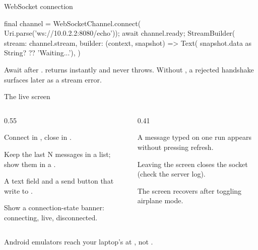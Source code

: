 \documentclass[10pt,aspectratio=169,t]{beamer}
\begin{document}
\begin{frame}[fragile,eyebrow=Task III]{WebSocket connection}
\begin{dart}
final channel = WebSocketChannel.connect(
    Uri.parse('ws://10.0.2.2:8080/echo'));
await channel.ready;
StreamBuilder(
  stream: channel.stream,
  builder: (context, snapshot) => Text(
      snapshot.data as String? ?? 'Waiting...'),
)
\end{dart}
  \begin{takeaway}{Await  after .}
     returns instantly and never throws. Without , a rejected handshake surfaces later as a stream error.
  \end{takeaway}
\end{frame}

\begin{frame}[eyebrow=Task III]{The live screen}
  \begin{columns}[T]
    \begin{column}{0.55\textwidth}
      \begin{steps}
        \item Connect in , close in .
        \item Keep the last N messages in a list; show them in a .
        \item A text field and a send button that write to .
        \item Show a connection-state banner: connecting, live, disconnected.
      \end{steps}
    \end{column}
    \begin{column}{0.41\textwidth}
      \begin{checklist}
        \item A message typed on one run appears without pressing refresh.
        \item Leaving the screen closes the socket (check the server log).
        \item The screen recovers after toggling airplane mode.
      \end{checklist}
    \end{column}
  \end{columns}
  \begin{hint}
    Android emulators reach your laptop's  at , not .
  \end{hint}
\end{frame}
\end{document}
